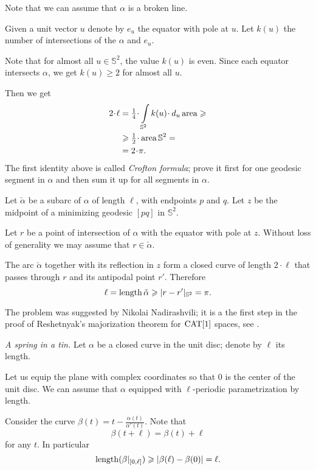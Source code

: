 Note that we can assume that $\alpha$ is a broken line.

Given a unit vector $u$ denote by $e_u$ the equator with pole at $u$.
Let $k(u)$ the number of intersections
of the $\alpha$ and $e_u$.

Note that for almost all $u\in \mathbb{S}^2$, the value $k(u)$ is even.
Since each equator intersects $\alpha$, we get $k(u)\ge 2$ for almost all $u$.

Then we get
\begin{align*}
2\cdot\ell&=\tfrac14\cdot\int\limits_{\mathbb{S}^2}k(u)\cdot\, d_u\area\ge 
\\
&\ge\tfrac12\cdot\area\mathbb{S}^2=
\\
&=2\cdot\pi.
\end{align*}
The first identity above is called \emph{Crofton formula};
prove it first for one geodesic segment in $\alpha$ and then sum it up for all segments in $\alpha$.

Let $\check\alpha$ be a subarc of $\alpha$ of length $\ell$, with endpoints $p$ and $q$.  
Let $z$ be the midpoint of a minimizing geodesic $[pq]$ in $\mathbb{S}^2$.  

Let $r$ be a point of intersection of $\alpha$ with the equator with pole at $z$.  
Without loss of generality we may assume that $r\in\check\alpha$. 

The arc $\check\alpha$ together with its reflection in $z$ 
form a closed curve of length $2\cdot \ell$ 
that passes through $r$ and its antipodal point $r'$.
Therefore 
\[\ell=\operatorname{\rm length} \check\alpha\geqslant |r-r'|_{\mathbb S^2}=\pi.\]

The problem was suggested by Nikolai Nadirashvili;
it is a the first step 
in the proof of Reshetnyak's majorization theorem for $\operatorname{\rm CAT}\nolimits[1]$ spaces, see \cite{akp}.
 


 \textit{A spring in a tin.}
Let $\alpha$ be a closed curve in the unit disc;
denote by $\ell$ its length.

Let us equip the plane with complex coordinates so that $0$ is the center of the unit disc.
We can assume that $\alpha$ equipped with $\ell$-periodic parametrization by length.

Consider the curve $\beta(t)=t-\tfrac{\alpha(t)}{\alpha'(t)}$.
Note that 
\[\beta(t+\ell)=\beta(t)+\ell\] 
for any $t$.
In particular 
\[\operatorname{\rm length} (\beta|_{[0,\ell]}) 
\geqslant 
|\beta(\ell)-\beta(0)|
=
\ell.\]

